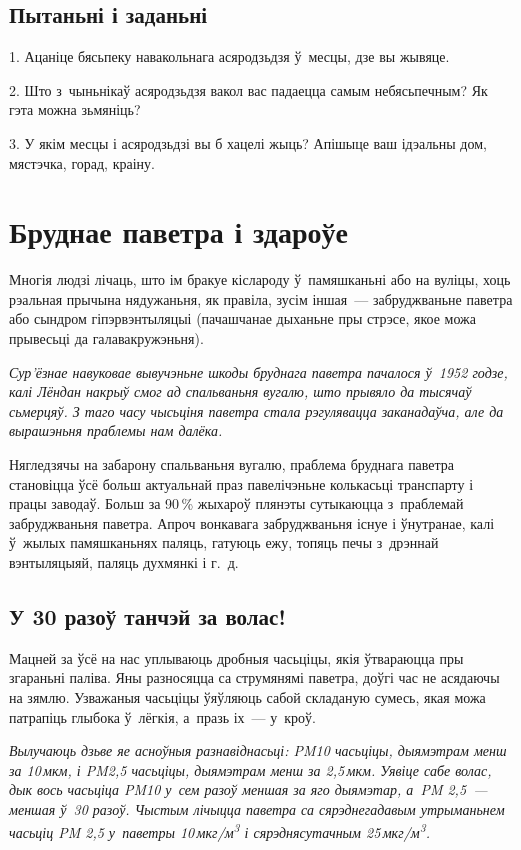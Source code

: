 \subsection*{Пытаньні і заданьні}

1. Ацаніце бясьпеку навакольнага асяродзьдзя ў~месцы, дзе вы жывяце.

2. Што з~чыньнікаў асяродзьдзя вакол вас падаецца самым небясьпечным? Як гэта можна зьмяніць?

3. У якім месцы і асяродзьдзі вы б хацелі жыць? Апішыце ваш ідэальны дом, мястэчка, горад, краіну.


\section{Бруднае паветра і здароўе}

Многія людзі лічаць, што ім бракуе кіслароду ў~памяшканьні або на вуліцы, хоць рэальная прычына нядужаньня, як правіла, зусім іншая~--- забруджваньне паветра або сындром гіпэрвэнтыляцыі (пачашчанае дыханьне пры стрэсе, якое можа прывесьці да галавакружэньня).


\emph{Сур'ёзнае навуковае вывучэньне шкоды бруднага паветра пачалося ў~1952 годзе, калі Лёндан накрыў смог ад спальваньня вугалю, што прывяло да тысячаў сьмерцяў. З таго часу чысьціня паветра стала рэгулявацца заканадаўча, але да вырашэньня праблемы нам далёка.}

Нягледзячы на забарону спальваньня вугалю, праблема бруднага паветра становіцца ўсё больш актуальнай праз павелічэньне колькасьці транспарту і працы заводаў. Больш за 90\,\% жыхароў плянэты сутыкаюцца з~праблемай забруджваньня паветра. Апроч вонкавага забруджваньня існуе і ўнутранае, калі ў~жылых памяшканьнях паляць, гатуюць ежу, топяць печы з~дрэннай вэнтыляцыяй, паляць духмянкі і г.~д.

\subsection*{У 30 разоў танчэй за волас!}

Мацней за ўсё на нас уплываюць дробныя часьціцы, якія ўтвараюцца пры згараньні паліва. Яны разносяцца са струмянямі паветра, доўгі час не асядаючы на зямлю. Узважаныя часьціцы ўяўляюць сабой складаную сумесь, якая можа патрапіць глыбока ў~лёгкія, а~празь іх~--- у~кроў.

\emph{Вылучаюць дзьве яе асноўныя разнавіднасьці: PM10 часьціцы, дыямэтрам менш за 10\,мкм, і PM2,5 часьціцы, дыямэтрам менш за 2,5\,мкм. Уявіце сабе волас, дык вось часьціца PM10 у~сем разоў меншая за яго дыямэтар, а~PM 2,5~--- меншая ў~30 разоў. Чыстым лічыцца паветра са сярэднегадавым утрыманьнем часьціц PM 2,5 у~паветры 10\,мкг/м\textsuperscript{3} і сярэднясутачным 25\,мкг/м\textsuperscript{3}.}

